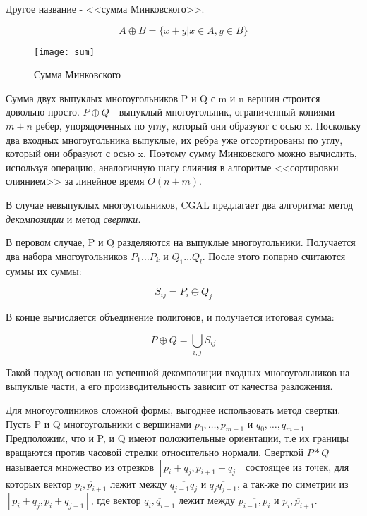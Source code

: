 Другое название - <<сумма Минковского>>.

\begin{equation}
    A \oplus B = \{x + y | x \in A, y \in B \}  
\end{equation}


\begin{figure}
    \centering
    \texttt{[image: sum]} 
    \caption{Сумма Минковского}
    \label{fig:sum}
\end{figure}
 

Сумма двух выпуклых многоугольников P и Q с m и n вершин
строится довольно просто.
$P \oplus Q$ - выпуклый многоугольник,
ограниченный копиями $m + n$ ребер,
упорядоченных по углу, который они образуют с осью x.
Поскольку два входных многоугольника выпуклые,
их ребра уже отсортированы по углу,
который они образуют с осью x. 
Поэтому сумму Минковского можно вычислить,
используя операцию,
аналогичную шагу слияния в алгоритме <<сортировки слиянием>> за линейное время $O(n+m)$.

В случае невыпуклых многоугольников,
CGAL предлагает два алгоритма:
метод \textit{декомпозиции} и метод \textit{свертки}.

В перовом случае, P и Q разделяются на выпуклые многоугольники.
Получается два набора многоугольников $P_1 \dots P_k$ и $Q_1 \dots Q_l$.
После этого попарно считаются суммы их суммы:

\begin{equation}
    S_{ij}=P_i \oplus Q_j   
\end{equation}

В конце вычисляется объединение полигонов,
и получается итоговая сумма:

\begin{equation}
    P \oplus Q = \bigcup\limits_{i,j} S_{ij}
\end{equation}


Такой подход основан на успешной декомпозиции
входных многоугольников на выпуклые части,
а его производительность зависит от качества разложения.

Для многоуголиников сложной формы,
выгоднее использовать метод свертки.
Пусть P и Q многоугольники с вершинами
$p_0, \dots, p_{m-1}$ и $q_0, \dots, q_{m-1}$
Предположим, что и P, и Q имеют положительные ориентации, т.е
их границы вращаются против часовой стрелки относительно нормали.
Сверткой $P * Q$ называется множество из отрезков $[p_i+q_j, p_{i+1}+q_j]$
состоящее из точек, для которых вектор $\overline{p_i,p_{i+1}}$ 
лежит между $\overline{q_{j−1}q_j}$ и $\overline{q_jq_{j+1}}$,
а так-же по симетрии из $[p_i+q_j, p_i+q_{j+1}]$,
где вектор $\overline{q_i,q_{i+1}}$
лежит между $\overline{p_{i-1},p_i}$ и $\overline{p_i,p_{i+1}}$.

